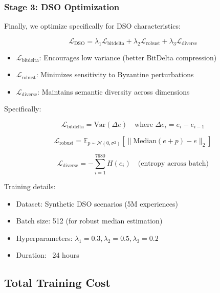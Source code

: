 \documentclass[11pt,letterpaper]{article}
\begin{document}
\subsubsection{Stage 3: DSO Optimization}

Finally, we optimize specifically for DSO characteristics:

\begin{equation}
\mathcal{L}_{\text{DSO}} = \lambda_1 \mathcal{L}_{\text{bitdelta}} + \lambda_2 \mathcal{L}_{\text{robust}} + \lambda_3 \mathcal{L}_{\text{diverse}}
\end{equation}

\begin{itemize}
    \item $\mathcal{L}_{\text{bitdelta}}$: Encourages low variance (better BitDelta compression)
    \item $\mathcal{L}_{\text{robust}}$: Minimizes sensitivity to Byzantine perturbations
    \item $\mathcal{L}_{\text{diverse}}$: Maintains semantic diversity across dimensions
\end{itemize}

Specifically:

\begin{equation}
\mathcal{L}_{\text{bitdelta}} = \text{Var}(\Delta e) \quad \text{where } \Delta e_i = e_i - e_{i-1}
\end{equation}

\begin{equation}
\mathcal{L}_{\text{robust}} = \mathbb{E}_{p \sim \mathcal{N}(0, \sigma^2)} \left[\|\text{Median}(e + p) - e\|_2\right]
\end{equation}

\begin{equation}
\mathcal{L}_{\text{diverse}} = -\sum_{i=1}^{7680} H(e_i) \quad \text{(entropy across batch)}
\end{equation}

Training details:
\begin{itemize}
    \item Dataset: Synthetic DSO scenarios (5M experiences)
    \item Batch size: 512 (for robust median estimation)
    \item Hyperparameters: $\lambda_1 = 0.3, \lambda_2 = 0.5, \lambda_3 = 0.2$
    \item Duration: ~24 hours
\end{itemize}

\subsection{Total Training Cost}
\end{document}
